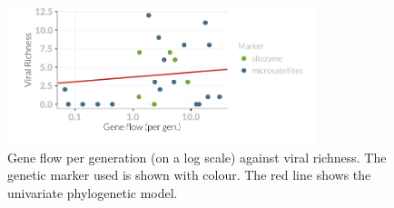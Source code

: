 


























































\begin{knitrout}\footnotesize
{}\color{fgcolor}\begin{figure}[t]

{\centering \includegraphics[width=0.8\textwidth]{figure/fstRawData-1} 

}

\caption[Gene flow per generation (on a log scale) against viral richness]{Gene flow per generation (on a log scale) against viral richness. The genetic marker used is shown with colour. The red line shows the univariate phylogenetic model.}\label{fig:fstRawData}
\end{figure}


\end{knitrout}



